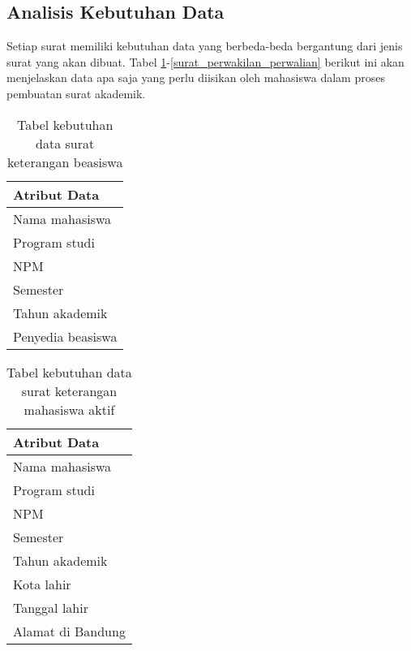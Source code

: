 \subsection{Analisis Kebutuhan Data}
\label{sec:analisis_kebutuhan_data}
Setiap surat memiliki kebutuhan data yang berbeda-beda bergantung dari jenis surat yang akan dibuat. Tabel \ref{surat_keterangan_beasiswa}-\ref{surat_perwakilan_perwalian} berikut ini akan menjelaskan data apa saja yang perlu diisikan oleh mahasiswa dalam proses pembuatan surat akademik.\

\begin{table}[h]
\centering
\caption{Tabel kebutuhan data surat keterangan beasiswa}
\label{surat_keterangan_beasiswa}
\begin{tabular}{|l|}
\hline
\textbf{Atribut Data}                     \\ \hline
Nama mahasiswa                            \\ \hline 
Program studi                             \\ \hline 
NPM                             			\\ \hline
Semester			                        \\ \hline
Tahun akademik        			        \\ \hline
Penyedia beasiswa                         \\ \hline
\end{tabular}
\end{table}

\begin{table}[h]
\centering
\caption{Tabel kebutuhan data surat keterangan mahasiswa aktif}
\label{surat_keterangan_mahasiswa_aktif}
\begin{tabular}{|l|}
\hline
\textbf{Atribut Data}                     \\ \hline
Nama mahasiswa                            \\ \hline 
Program studi                             \\ \hline 
NPM                             			\\ \hline 
Semester                     				\\ \hline 
Tahun akademik                         	\\ \hline 
Kota lahir               					\\ \hline 
Tanggal lahir             				\\ \hline 
Alamat di Bandung                    		\\ \hline 
\end{tabular}
\end{table}

